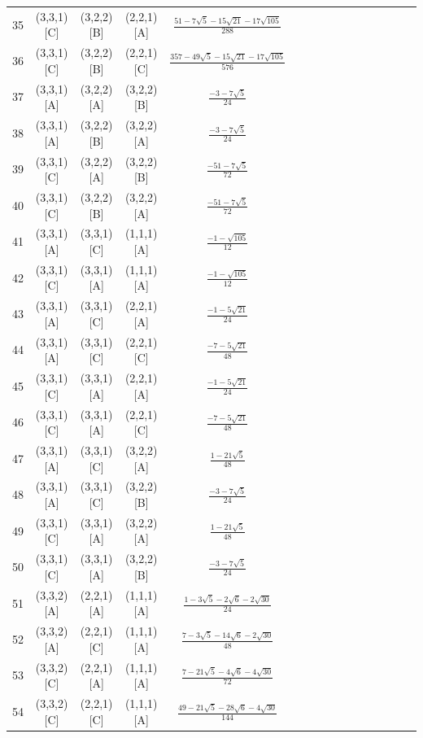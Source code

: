 \documentclass[11pt]{article}
\begin{document}
\begin{longtable}{ | p{1cm}| *{15}{c|} }
35 & (3,3,1)[C] & (3,2,2)[B] & (2,2,1)[A] & $\frac{51-7\sqrt{5}-15\sqrt{21}-17\sqrt{105}}{288}$\\ %
36 & (3,3,1)[C] & (3,2,2)[B] & (2,2,1)[C] & $\frac{357-49\sqrt{5}-15\sqrt{21}-17\sqrt{105}}{576}$\\ %
37 & (3,3,1)[A] & (3,2,2)[A] & (3,2,2)[B] & $\frac{-3-7\sqrt{5}}{24}$\\ %
38 & (3,3,1)[A] & (3,2,2)[B] & (3,2,2)[A] & $\frac{-3-7\sqrt{5}}{24}$\\ %
39 & (3,3,1)[C] & (3,2,2)[A] & (3,2,2)[B] & $\frac{-51-7\sqrt{5}}{72}$\\ %
40 & (3,3,1)[C] & (3,2,2)[B] & (3,2,2)[A] & $\frac{-51-7\sqrt{5}}{72}$\\ %
41 & (3,3,1)[A] & (3,3,1)[C] & (1,1,1)[A] & $\frac{-1-\sqrt{105}}{12}$\\ %
42 & (3,3,1)[C] & (3,3,1)[A] & (1,1,1)[A] & $\frac{-1-\sqrt{105}}{12}$\\ %
43 & (3,3,1)[A] & (3,3,1)[C] & (2,2,1)[A] & $\frac{-1-5\sqrt{21}}{24}$\\ %
44 & (3,3,1)[A] & (3,3,1)[C] & (2,2,1)[C] & $\frac{-7-5\sqrt{21}}{48}$\\ %
45 & (3,3,1)[C] & (3,3,1)[A] & (2,2,1)[A] & $\frac{-1-5\sqrt{21}}{24}$\\ %
46 & (3,3,1)[C] & (3,3,1)[A] & (2,2,1)[C] & $\frac{-7-5\sqrt{21}}{48}$\\ %
47 & (3,3,1)[A] & (3,3,1)[C] & (3,2,2)[A] & $\frac{1-21\sqrt{5}}{48}$\\ %
48 & (3,3,1)[A] & (3,3,1)[C] & (3,2,2)[B] & $\frac{-3-7\sqrt{5}}{24}$\\ %
49 & (3,3,1)[C] & (3,3,1)[A] & (3,2,2)[A] & $\frac{1-21\sqrt{5}}{48}$\\ %
50 & (3,3,1)[C] & (3,3,1)[A] & (3,2,2)[B] & $\frac{-3-7\sqrt{5}}{24}$\\ %
51 & (3,3,2)[A] & (2,2,1)[A] & (1,1,1)[A] & $\frac{1-3\sqrt{5}-2\sqrt{6}-2\sqrt{30}}{24}$\\ %
52 & (3,3,2)[A] & (2,2,1)[C] & (1,1,1)[A] & $\frac{7-3\sqrt{5}-14\sqrt{6}-2\sqrt{30}}{48}$\\ %
53 & (3,3,2)[C] & (2,2,1)[A] & (1,1,1)[A] & $\frac{7-21\sqrt{5}-4\sqrt{6}-4\sqrt{30}}{72}$\\ %
54 & (3,3,2)[C] & (2,2,1)[C] & (1,1,1)[A] & $\frac{49-21\sqrt{5}-28\sqrt{6}-4\sqrt{30}}{144}$\\ %

\end{longtable}
\end{document}
